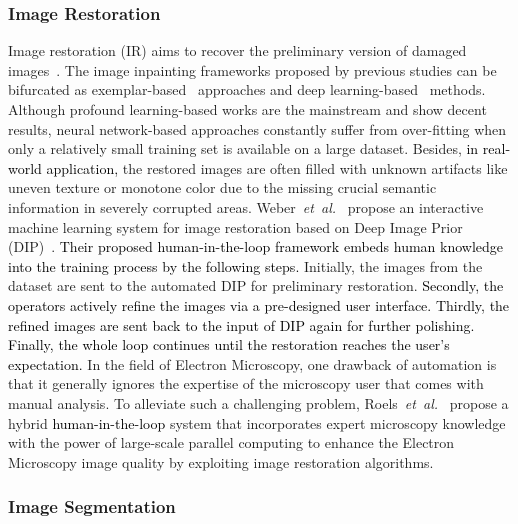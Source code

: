 \documentclass{article}
\newcommand\etal{\emph{et~al.}}
\newcommand{\REO}[1]{\textcolor{black}{#1}}
\newcommand{\ZJH}[1]{\textcolor{black}{#1}}
\begin{document}
\subsubsection{Image Restoration}
Image restoration (IR) aims to recover the preliminary version of damaged images~\cite{andrews1977digital}. The image inpainting frameworks proposed by previous studies can be bifurcated as exemplar-based~\cite{criminisi2003object} approaches and deep learning-based~\cite{liu2018image} methods. Although profound learning-based works are the mainstream and show decent results, neural network-based approaches constantly suffer from over-fitting when only a relatively small training set is available on a large dataset. Besides, \ZJH{in real-world application,} the restored images are often filled with unknown artifacts like uneven texture or monotone color due to the missing crucial semantic information in severely corrupted areas. Weber~\etal~\cite{weber2020draw} propose an interactive machine learning system for image restoration based on Deep Image Prior (DIP)~\cite{ulyanov2018deep}.
\ZJH{Their proposed \REO{human-in-the-loop} framework embeds human knowledge into the training process by the following steps. }
Initially, the images from the dataset are sent to the automated DIP for preliminary restoration.
\ZJH{Secondly, the operators actively refine the images via a pre-designed user interface.
Thirdly, the refined images are sent back to the input of DIP again for further polishing. Finally, the whole loop continues until the restoration reaches the user's expectation.} In the field of Electron Microscopy, one drawback of automation is that it generally ignores the expertise of the microscopy user that comes with manual analysis. To alleviate such a challenging problem, Roels~\etal~\cite{roels2019human} propose a hybrid \REO{human-in-the-loop} system that incorporates expert microscopy knowledge with the power of large-scale parallel computing to enhance the Electron Microscopy image quality by exploiting image restoration algorithms.

\subsubsection{Image Segmentation}
\end{document}
